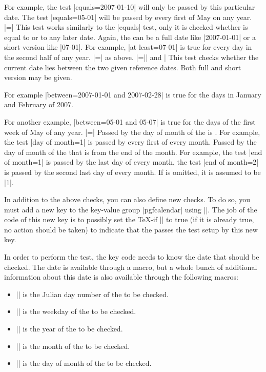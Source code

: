 \begin{command}{\pgfcalendarifdate{}}
\begin{itemize}
  For example, the test |equals=2007-01-10| will only be passed by this
  particular date. The test |equals=05-01| will be passed by every first
  of May on any year.
  |=| This test works
  similarly to the |equals| test, only it is checked whether
   is equal to  or to any later
  date. Again, the  can be a full date like
  |2007-01-01| or a short version like |07-01|. For example,
  |at least=07-01| is true for every day in the second half of any
  year.
  |=| as above.
  |=|| and | This test checks whether the current date lies between
  the two given reference dates. Both full and short version may be
  given.

  For example |between=2007-01-01 and 2007-02-28| is true for the days
  in January and February of 2007.

  For another example, |between=05-01 and 05-07| is true for the
  days of the first week of May of any year.
  |=| Passed by the day
  of month of the  is . For example, the test
  |day of month=1| is passed by every first of every month.
   Passed by
  the day of month of the  that is  from the
  end of the month. For example, the test |end of month=1| is passed
  by the last day of every month, the test |end of month=2| is passed
  by the second last day of every month. If  is omitted,
  it is assumed to be |1|.
  \end{itemize}

  In addition to the above checks, you can also define new checks. To
  do so, you must add a new key to the key-value group |pgfcalendar|
  using ||. The job of the code of this new key is to
  possibly set the \TeX-if |\ifpgfcalendarmatches| to true (if it is
  already true, no action should be taken) to indicate that the
   passes the test setup by this new key.

  In order to perform the test, the key code needs to know the date
  that should be checked. The date is available through a macro, but a
  whole bunch of additional information about this date is also
  available through the following macros:
  \begin{itemize}
  \item |\pgfcalendarifdatejulian|
    is the Julian day number of the  to be checked.
  \item |\pgfcalendarifdateweekday|
    is the weekday of the  to be checked.
  \item |\pgfcalendarifdateyear|
    is the year of the  to be checked.
  \item |\pgfcalendarifdatemonth|
    is the month of the  to be checked.
  \item |\pgfcalendarifdateday|
    is the day of month of the  to be checked.
  \end{itemize}


\end{command}
